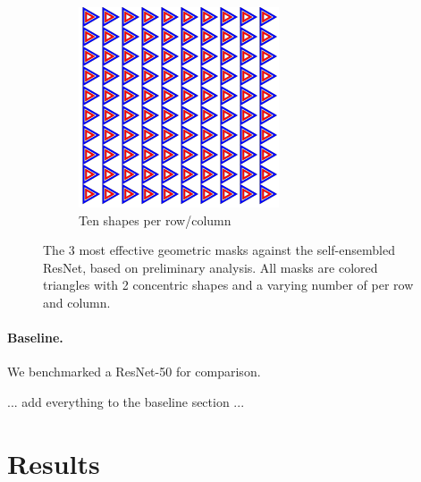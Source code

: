 \documentclass[a4paper, oneside]{discothesis}
\begin{document}
\begin{figure}[th]
	\hfill
	\begin{subfigure}[t]{0.19\textwidth}\centering\includegraphics[width=\linewidth]{figures/3_10_2_True.png}\caption{Ten shapes per row/column}\label{fig:atk7}\end{subfigure}

	\caption{The 3 most effective geometric masks against the self-ensembled ResNet, based on preliminary analysis. All masks are colored triangles with 2 concentric shapes and a varying number of per row and column.}
	\label{fig:attacks-v2-subset}
\end{figure}



\paragraph{Baseline.} We benchmarked a ResNet-50 for comparison.

... add everything to the baseline section ...









\section{Results}
\end{document}
